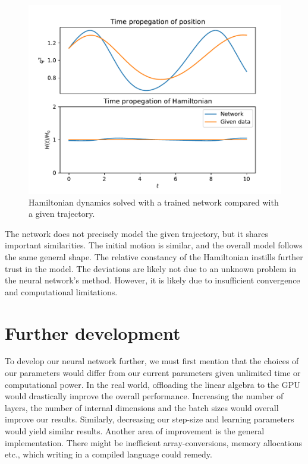 \documentclass{article}
\begin{document}
\begin{figure}[h!]
    \centering
    \includegraphics[width=\linewidth]{ham_ode.pdf}
    \caption{Hamiltonian dynamics solved with a trained network compared with a given trajectory.}
    \label{fig:ham_ode}
\end{figure}

The network does not precisely model the given trajectory, but it shares important similarities. The initial motion is similar, and the overall model follows the same general shape. The relative constancy of the Hamiltonian instills further trust in the model. The deviations are likely not due to an unknown problem in the neural network's method. However, it is likely due to insufficient convergence and computational limitations.

\section{Further development}
To develop our neural network further, we must first mention that the choices of our parameters would differ from our current parameters given unlimited time or computational power. In the real world, offloading the linear algebra to the GPU would drastically improve the overall performance. Increasing the number of layers, the number of internal dimensions and the batch sizes would overall improve our results. Similarly, decreasing our step-size and learning parameters would yield similar results. Another area of improvement is the general implementation. There might be inefficient array-conversions, memory allocations etc., which writing in a compiled language could remedy. 
\end{document}
